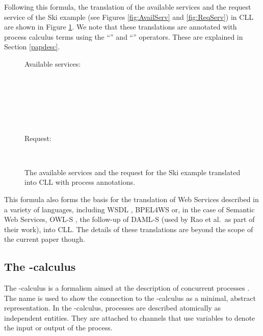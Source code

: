 \documentclass[copyright,creativecommons]{eptcs}
\begin{document}
Following this formula, the translation of the available services and the request service of the Ski example (see Figures \ref{fig:AvailServ} and \ref{fig:ReqServ}) in CLL are shown in Figure \ref{fig:AvailServCLL}. We note that these translations are annotated with process calculus terms using the ``'' and ``'' operators. These are explained in Section \ref{papdesc}. 

\begin{figure}[htbp]
\begin{center}
		Available services: \\
		\medskip
\begin{minipage}{.75\linewidth}
\scriptsize
	 \\
	 \\
	 \\
	 \\
	 \\
\end{minipage}
\end{center}
\normalsize	  
\begin{center}
Request:  \\
\medskip
\begin{minipage}{.9\linewidth}
\scriptsize
		 \\
\end{minipage}
\end{center}
\normalsize
	\caption{The available services and the request for the Ski example translated into CLL with process annotations.}
	\label{fig:AvailServCLL}
\end{figure}

This formula also forms the basis for the translation of Web Services described in a variety of languages, including WSDL \cite{christensen2001web}, BPEL4WS \cite{andrews2003business} or, in the case of Semantic Web Services, OWL-S \cite{martin2004owl}, the follow-up of DAML-S \cite{coalition2002daml} (used by Rao et al.\ as part of their work), into CLL. The details of these translations are beyond the scope of the current paper though.

\subsection{The -calculus}
\label{pi}

The -calculus is a formalism aimed at the description of concurrent processes \cite{milner1999communicating}. The name is used to show the connection to the -calculus as a minimal, abstract representation. In the -calculus, processes are described atomically as independent entities. They are attached to channels that use variables to denote the input or output of the process. 
\end{document}
